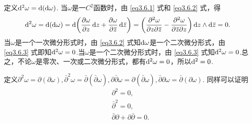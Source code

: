 定义$\mathop{}\!\mathrm{d} ^2\omega=\mathop{}\!\mathrm{d} (\mathop{}\!\mathrm{d} \omega)$. 当$\omega$是一$C^2$函数时，由 \eqref{eq3.6.1} 式和 \eqref{eq3.6.2} 式，得
\begin{equation}\label{eq3.6.4}
  \dif ^2\omega=\dif (\dif \omega) = \dif \bigg(
  \pp\omega z\dz+\pp\omega{\bar z}\dzz\bigg) = \bigg(\pppp\omega z{\bar z}-
  \pppp\omega{\bar z}z\bigg)\dz\wedge\dzz=0.
\end{equation}
当$\omega$是一个一次微分形式时，由 \eqref{eq3.6.2} 式知$\mathop{}\!\mathrm{d} \omega$是一个二次微分形式，由 \eqref{eq3.6.3} 式即知$\mathop{}\!\mathrm{d} ^2\omega=0$.当$\omega$是一个二次微分形式时，由 \eqref{eq3.6.3} 式知$\mathop{}\!\mathrm{d} ^2\omega=0$.总之，不论$\omega$是零次、一次或二次微分形式，都有$\mathop{}\!\mathrm{d} ^2\omega=0$，所以$\mathop{}\!\mathrm{d} ^2=0$.

定义$\partial^2\omega=\partial(\partial\omega),\bar\partial^2\omega=
\bar\partial(\bar\partial\omega),\partial\bar\partial\omega=\partial(\bar\partial\omega),
\bar\partial\partial\omega=\bar\partial(\partial\omega)$. 同样可以证明
\begin{equation}\label{eq3.6.5}
  \begin{aligned}
    & \partial^2 = 0,\\
    & \bar\partial^2 = 0,\\
    & \bar\partial\partial + \partial\bar\partial = 0.
  \end{aligned}
\end{equation}

